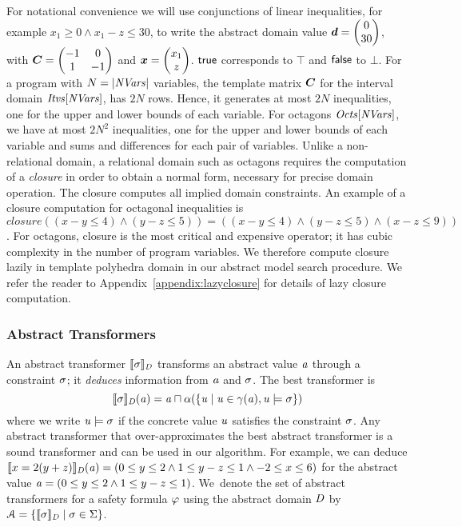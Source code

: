 For notational convenience we will use conjunctions of linear
inequalities, for example $x_1\geq 0 \wedge x_1-z\leq 30$, to write the
abstract domain value $\vec{\numabsval}=\vecv{0}{30}$,
with $\mat{C}=\qmat{-1}{0}{1}{-1}$ and $\vec{\numvar}=\vecv{x_1}{z}$. 
$\mathsf{true}$ corresponds to $\top$ and $\mathsf{false}$ to $\bot$.
%
For a program with $N=|\mathit{NVars}|$ variables, the template 
matrix ${\boldsymbol C}$ for the interval domain $\mathit{Itvs}[\mathit{NVars}]$, 
has $2N$ rows. Hence, it generates at most $2N$ inequalities, one
for the upper and lower bounds of each variable.
%
For octagons $\mathit{Octs}[\mathit{NVars}]$, we have at most $2N^2$
inequalities, one for the upper and lower bounds of each variable and
sums and differences for each pair of variables. 
Unlike a non-relational domain, a relational domain such as octagons 
requires the computation of a \emph{closure} in order to obtain a normal 
form, necessary for precise domain operation. 
The closure computes all implied domain constraints.  
An example of a closure computation for octagonal inequalities is
$\mathit{closure}((x-y \leq 4) \wedge (y-z \leq 5))=((x-y \leq 4) \wedge (y-z
\leq 5) \wedge (x-z \leq 9))$.
%
For octagons, closure is the most critical and expensive operator; it has  
cubic complexity in the number of program variables.  
We therefore compute closure lazily in template polyhedra domain in our abstract 
model search procedure. We refer the reader to Appendix~\ref{appendix:lazyclosure} 
for details of lazy closure computation. 
\subsubsection{Abstract Transformers}
%
An abstract transformer $\llbracket \sigma \rrbracket_{\mathit{D}}$ transforms an
abstract value $\mathit{a}$ through a constraint $\sigma$; it
\emph{deduces} information from $\mathit{a}$ and $\sigma$.  The best
transformer is
%
\begin{equation}\label{eq:abstrans}
\llbracket \sigma \rrbracket_{\mathit{D}}(\mathit{a})=\mathit{a}\sqcap\alpha(\{\mathit{u}\mid \mathit{u}\in\gamma(\mathit{a}), \mathit{u}\models \sigma\})
\end{equation}
 where we write 
$\mathit{u}\models \sigma$ if the concrete value $\mathit{u}$ satisfies the constraint $\sigma$.
%
Any abstract transformer that over-approximates the best abstract
transformer is a sound transformer and can be used in our algorithm.
%
For example, we can deduce $\llbracket x=2(y+z) \rrbracket_{\mathit{D}}(\mathit{a})=(0\leq y
\leq 2 \wedge\allowbreak 1 \leq y-z \leq 1\wedge\allowbreak -2\leq x\leq 6)$
for the abstract value $\mathit{a}=(0\leq y \leq 2 \wedge\allowbreak 1 \leq y-z
\leq 1)$.
%
We~denote the set of abstract transformers for a safety formula
$\varphi$ using the abstract domain $\mathit{D}$ by
$\mathcal{A}=\{\llbracket \sigma \rrbracket_{\mathit{D}}\mid
\sigma\in\Sigma\}$.

